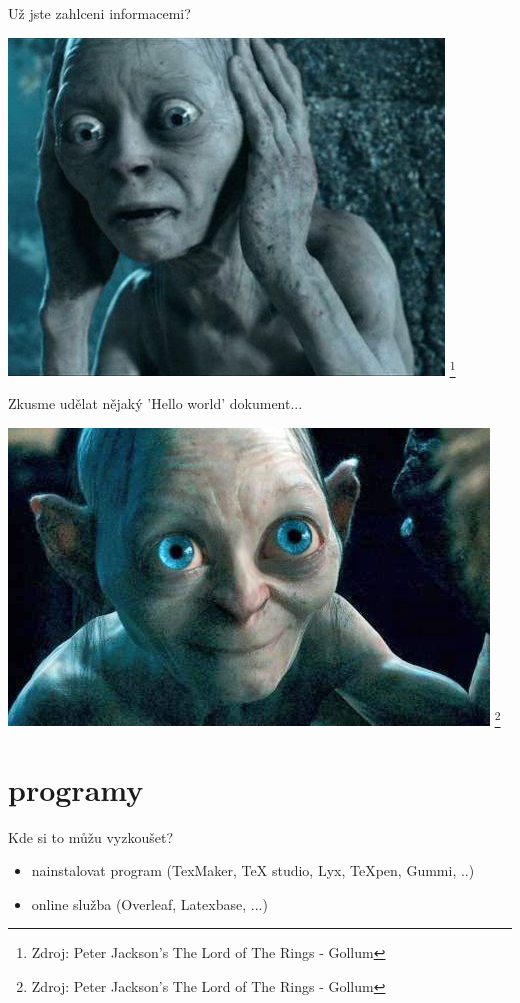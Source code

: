 \documentclass{beamer}
\begin{document}
\begin{frame}{Už jste zahlceni informacemi?}
\begin{center}
\includegraphics[width=.8\textwidth]{pic/glum1.jpeg}
\footnote{Zdroj: Peter Jackson's The Lord of The Rings - Gollum}
\end{center}
\end{frame}
\begin{frame}{Zkusme udělat nějaký 'Hello world' dokument...}
\begin{center}
\includegraphics[width=.8\textwidth]{pic/glum2.jpg}
\footnote{Zdroj: Peter Jackson's The Lord of The Rings - Gollum}
\end{center}\end{frame}

\section{programy}
\begin{frame}{Kde si to můžu vyzkoušet?}
\begin{itemize}
    \item nainstalovat program (TexMaker, TeX studio, Lyx, TeXpen, Gummi, ..)
    \item online služba (Overleaf, Latexbase, ...)
\end{itemize}
\end{frame}
\end{document}
